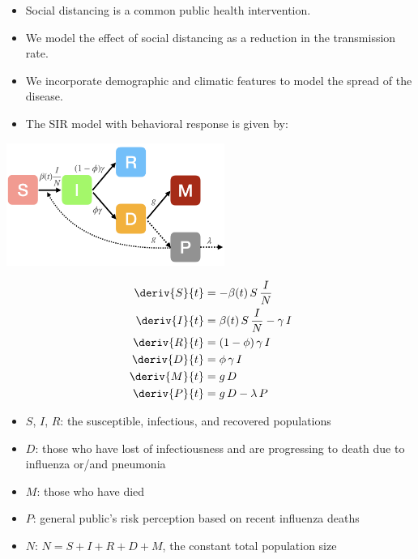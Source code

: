 \documentclass[
  letterpaper,
  DIV=11,
  numbers=noendperiod]{scrartcl}
\providecommand{\tightlist}{%
  \setlength{\itemsep}{0pt}\setlength{\parskip}{0pt}}\usepackage{longtable,booktabs,array}
\begin{document}
\begin{itemize}
\tightlist
\item
  Social distancing is a common public health intervention.
\item
  We model the effect of social distancing as a reduction in the
  transmission rate.
\item
  We incorporate demographic and climatic features to model the spread
  of the disease.
\item
  The SIR model with behavioral response is given by:
\end{itemize}

\begin{center}
    \includegraphics[height=4cm]{../graphics/sir-metapop.png}
\end{center}

\framebreak

\begin{equation*}
\begin{aligned}
  \deriv{S}{t} &= - \beta(t)\,S\,\frac{I}{N}\\
  \deriv{I}{t} &= \beta(t)\,S\,\frac{I}{N} - \gamma\,I \\
  \deriv{R}{t} &= (1-\phi)\,\gamma\,I \\
  \deriv{D}{t} &= \phi\,\gamma\,I \\
  \deriv{M}{t} &= g\,D \\
  \deriv{P}{t} &= g\,D - \lambda\,P
\end{aligned}
\end{equation*}

\begin{itemize}
\tightlist
\item
  \(S\), \(I\), \(R\): the susceptible, infectious, and recovered
  populations
\item
  \(D\): those who have lost of infectiousness and are progressing to
  death due to influenza or/and pneumonia
\item
  \(M\): those who have died
\item
  \(P\): general public's risk perception based on recent influenza
  deaths
\item
  \(N\): \(N=S+I+R+D+M\), the constant total population size
\end{itemize}
\end{document}
